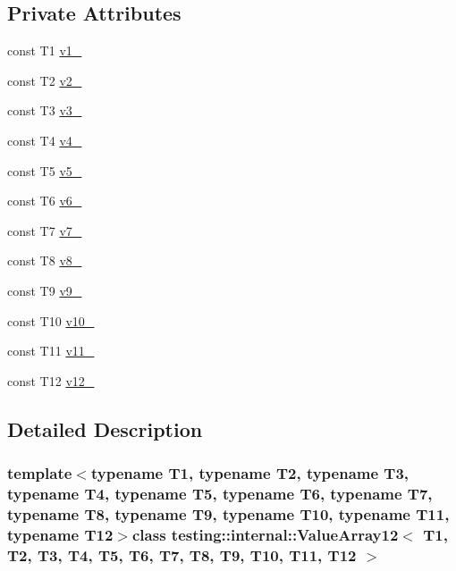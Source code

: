 \subsection*{\-Private \-Attributes}
\begin{DoxyCompactItemize}
\item 
const \-T1 \hyperlink{classtesting_1_1internal_1_1ValueArray12_aac1d0654cc6c1aceb4a5d0fa7a98042e}{v1\-\_\-}
\item 
const \-T2 \hyperlink{classtesting_1_1internal_1_1ValueArray12_a9f0a8ce6ce2fd27e980c4c51a7a7256a}{v2\-\_\-}
\item 
const \-T3 \hyperlink{classtesting_1_1internal_1_1ValueArray12_a4f8257321a2eab0456239174d6712d5e}{v3\-\_\-}
\item 
const \-T4 \hyperlink{classtesting_1_1internal_1_1ValueArray12_aac184059fee257381ccae81d8d112f85}{v4\-\_\-}
\item 
const \-T5 \hyperlink{classtesting_1_1internal_1_1ValueArray12_a1f3e0ada8419ed2e17cc61e6c0c54404}{v5\-\_\-}
\item 
const \-T6 \hyperlink{classtesting_1_1internal_1_1ValueArray12_a13d84d5824617bbc6fb1a6b3ee3cb745}{v6\-\_\-}
\item 
const \-T7 \hyperlink{classtesting_1_1internal_1_1ValueArray12_a4063f0b7a528133d018ee488ba44a9a3}{v7\-\_\-}
\item 
const \-T8 \hyperlink{classtesting_1_1internal_1_1ValueArray12_a596bc5260b2474271d1f6910ff6f665d}{v8\-\_\-}
\item 
const \-T9 \hyperlink{classtesting_1_1internal_1_1ValueArray12_a6356e16cf54a9dfac8525f20242af31e}{v9\-\_\-}
\item 
const \-T10 \hyperlink{classtesting_1_1internal_1_1ValueArray12_a147ca4457ea439b00a93087231ff77ef}{v10\-\_\-}
\item 
const \-T11 \hyperlink{classtesting_1_1internal_1_1ValueArray12_a12a4baf9ab57c7e9b5b4f1612e59e529}{v11\-\_\-}
\item 
const \-T12 \hyperlink{classtesting_1_1internal_1_1ValueArray12_a35ffe6d4d723857722ab319a235eddfc}{v12\-\_\-}
\end{DoxyCompactItemize}


\subsection{\-Detailed \-Description}
\subsubsection*{template$<$typename T1, typename T2, typename T3, typename T4, typename T5, typename T6, typename T7, typename T8, typename T9, typename T10, typename T11, typename T12$>$class testing\-::internal\-::\-Value\-Array12$<$ T1, T2, T3, T4, T5, T6, T7, T8, T9, T10, T11, T12 $>$}



